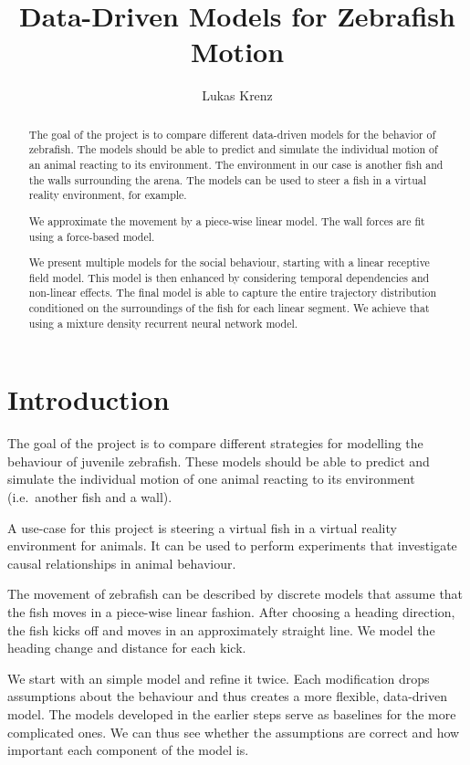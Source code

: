\documentclass[nobib, a4paper]{tufte-handout}
\title{Data-Driven Models for Zebrafish Motion}
\author[Lukas Krenz]{Lukas Krenz}
\begin{document}
\maketitle%

\begin{abstract}
\noindent
The goal of the project is to compare different data-driven models for the behavior of zebrafish.
The models should be able to predict and simulate the individual motion of an animal reacting to its environment.
The environment in our case is another fish and the walls surrounding the arena.
The models can be used to steer a fish in a virtual reality environment, for example.

We approximate the movement by a piece-wise linear model.
The wall forces are fit using a force-based model.

We present multiple models for the social behaviour, starting with a linear receptive field model.
This model is then enhanced by considering temporal dependencies and non-linear effects.
The final model is able to capture the entire trajectory distribution conditioned on the surroundings of the fish for each linear segment.
We achieve that using a mixture density recurrent neural network model.
\end{abstract}

\section{Introduction}
The goal of the project is to compare different strategies for modelling the behaviour of juvenile zebrafish.
These models should be able to predict and simulate the individual motion of one animal reacting to its environment (i.e.\ another fish and a wall).

A use-case for this project is steering a virtual fish in a virtual reality environment for animals.
It can be used to perform experiments that investigate causal relationships in animal behaviour.

The movement of zebrafish can be described by discrete models that assume that the fish moves in a piece-wise linear fashion.
After choosing a heading direction, the fish kicks off and moves in an approximately straight line.
We model the heading change and distance for each kick.

We start with an simple model and refine it twice.
Each modification drops assumptions about the behaviour and thus creates a more flexible, data-driven model.
The models developed in the earlier steps serve as baselines for the more complicated ones.
We can thus see whether the assumptions are correct and how important each component of the model is.
\end{document}
